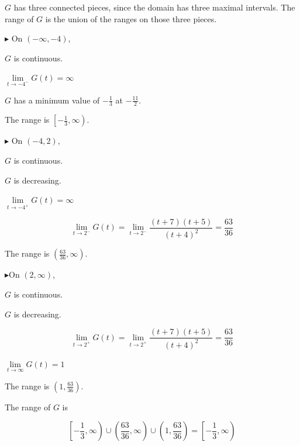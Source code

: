 \documentclass{ximera}
\begin{document}
\begin{explanation}

$G$ has three connected pieces, since the domain has three maximal intervals.  The range of $G$ is the union of the ranges on those three pieces. 





\textbf{\textcolor{blue!55!black}{$\blacktriangleright$}} On $( -\infty, -4)$, 

$G$ is continuous.

$\lim\limits_{t \to -4^-} G(t) = \infty$

$G$ has a minimum value of $-\frac{1}{3}$ at $-\frac{11}{2}$.



The range is $\left[ -\frac{1}{3}, \infty \right)$.






\textbf{\textcolor{blue!55!black}{$\blacktriangleright$}} On $(-4, 2)$, 

$G$ is continuous.

$G$ is decreasing.

$\lim\limits_{t \to -4^+} G(t) = \infty$





\[
\lim\limits_{t \to 2^-} G(t) = \lim\limits_{t \to 2^-} \frac{(t+7)(t+5)}{(t+4)^2} = \frac{63}{36}
\]




The range is $\left( \frac{63}{36}, \infty \right)$.









\textbf{\textcolor{blue!55!black}{$\blacktriangleright$}}On $(2, \infty)$, 

$G$ is continuous.

$G$ is decreasing.



\[
\lim\limits_{t \to 2^+} G(t) = \lim\limits_{t \to 2^+} \frac{(t+7)(t+5)}{(t+4)^2} = \frac{63}{36}
\]


$\lim\limits_{t \to \infty} G(t) = 1$

The range is $\left( 1, \frac{63}{36} \right)$.








The range of $G$ is 

\[
\left[ -\frac{1}{3}, \infty \right) \cup \left( \frac{63}{36}, \infty \right) \cup  \left( 1, \frac{63}{36} \right) = \left[ -\frac{1}{3}, \infty \right)
\]






\end{explanation}
\end{document}
